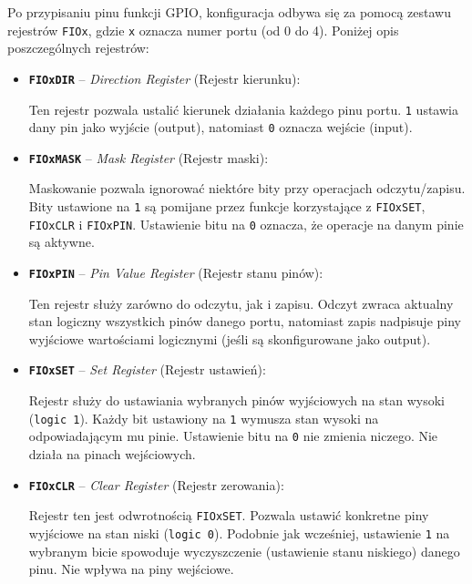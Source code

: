 Po przypisaniu pinu funkcji GPIO, konfiguracja odbywa się za pomocą zestawu rejestrów \texttt{FIOx}, gdzie \texttt{x} oznacza numer portu (od 0 do 4). Poniżej opis poszczególnych rejestrów:

\begin{itemize}
    \item \textbf{\texttt{FIOxDIR}} – \textit{Direction Register} (Rejestr kierunku):

    Ten rejestr pozwala ustalić kierunek działania każdego pinu portu. 
    \texttt{1} ustawia dany pin jako wyjście (output), natomiast \texttt{0} oznacza wejście (input). 


    \item \textbf{\texttt{FIOxMASK}} – \textit{Mask Register} (Rejestr maski):

    Maskowanie pozwala ignorować niektóre bity przy operacjach odczytu/zapisu. 
    Bity ustawione na \texttt{1} są pomijane przez funkcje korzystające z \texttt{FIOxSET}, \texttt{FIOxCLR} i \texttt{FIOxPIN}. 
    Ustawienie bitu na \texttt{0} oznacza, że operacje na danym pinie są aktywne.


    \item \textbf{\texttt{FIOxPIN}} – \textit{Pin Value Register} (Rejestr stanu pinów):

    Ten rejestr służy zarówno do odczytu, jak i zapisu. 
    Odczyt zwraca aktualny stan logiczny wszystkich pinów danego portu, natomiast zapis nadpisuje piny wyjściowe wartościami logicznymi (jeśli są skonfigurowane jako output).


    \item \textbf{\texttt{FIOxSET}} – \textit{Set Register} (Rejestr ustawień):

    Rejestr służy do ustawiania wybranych pinów wyjściowych na stan wysoki (\texttt{logic 1}). 
    Każdy bit ustawiony na \texttt{1} wymusza stan wysoki na odpowiadającym mu pinie. 
    Ustawienie bitu na \texttt{0} nie zmienia niczego. Nie działa na pinach wejściowych.


    \item \textbf{\texttt{FIOxCLR}} – \textit{Clear Register} (Rejestr zerowania):

    Rejestr ten jest odwrotnością \texttt{FIOxSET}. Pozwala ustawić konkretne piny wyjściowe na stan niski (\texttt{logic 0}). 
    Podobnie jak wcześniej, ustawienie \texttt{1} na wybranym bicie spowoduje wyczyszczenie (ustawienie stanu niskiego) danego pinu. 
    Nie wpływa na piny wejściowe.

\end{itemize}


